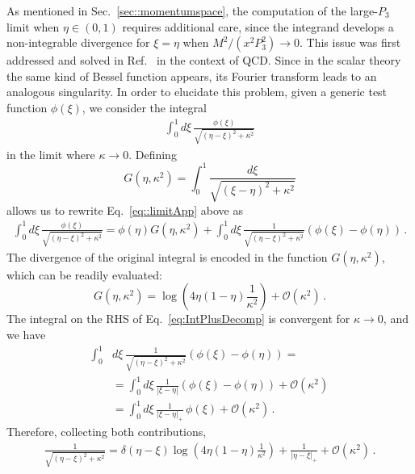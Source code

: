 As mentioned in Sec.~\ref{sec::momentumspace}, the computation of the
large-$P_3$ limit when $\eta \in \left(0,1\right)$ requires additional care,
since the integrand develops a non-integrable divergence for $\xi=\eta$ when
$M^2/(x^2P_3^2) \to 0$. This issue was first addressed and solved in Ref.~\cite{Radyushkin:2017lvu} in the context of QCD.
Since in the scalar theory the same kind of Bessel function appears, its Fourier transform leads to an analogous singularity. 
In order to elucidate this problem, given a generic test
function $\phi\left(\xi\right)$, we consider the integral
\begin{align}
    \label{eq::limitApp}
        \int_0^1 d\xi\,
        \frac{\phi\left(\xi\right)}{\sqrt{\left(\eta-\xi\right)^2 + \kappa^2}}
\end{align}
in the limit where $\kappa\to 0$. Defining 
\begin{equation}
    \label{eq:GfunDef}
    G\left(\eta, \kappa^2\right) = 
    \int_0^1 \frac{d\xi}{\sqrt{\left(\xi - \eta\right)^2 + \kappa^2}}
\end{equation}
allows us to rewrite Eq.~\eqref{eq::limitApp} above as 
\begin{align}
    \label{eq:IntPlusDecomp}
    \int_0^1 d\xi\,
    \frac{\phi\left(\xi\right)}{\sqrt{\left(\eta-\xi\right)^2 + \kappa^2}}
    = \phi(\eta) G\left(\eta, \kappa^2\right) + 
    \int_0^1 d\xi\,
    \frac{1}{\sqrt{\left(\eta-\xi\right)^2 + \kappa^2}}
    \left(\phi\left(\xi\right)-\phi\left(\eta\right)\right)\, .
\end{align}
The divergence of the original integral is encoded in the function
$G\left(\eta,\kappa^2\right)$, which can be readily evaluated:
\begin{equation}
    \label{eq:GfunIntegral}
    G\left(\eta, \kappa^2\right) =
    \log \left(4\eta\left(1-\eta\right)\frac{1}{\kappa^2}\right) +
    \mathcal O\left(\kappa^2\right)\, .
\end{equation}
The integral on the RHS of Eq.~\eqref{eq:IntPlusDecomp} is convergent for $\kappa\to
0$, and we have
\begin{align}
    \int_0^1 & d\xi\, 
    \frac{1}{\sqrt{\left(\eta-\xi\right)^2 + \kappa^2}} 
    \left(\phi\left(\xi\right)-\phi\left(\eta\right)\right) = 
    \nonumber \\
    &= \int_0^1 d\xi\, 
    \frac{1}{\left| \xi - \eta\right|}
    \left(\phi\left(\xi\right)-\phi\left(\eta\right)\right) 
    + \mathcal{O}(\kappa^2) \nonumber \\
    \label{eq:PlusDistrLimit}
    &= \int_0^1 d\xi\,
    \frac{1}{\left| \xi - \eta\right|_+}\,
    \phi\left(\xi\right) 
    + \mathcal{O}(\kappa^2) \, .
\end{align}
Therefore, collecting both contributions, 
\begin{align}
    \frac{1}{\sqrt{(\eta - \xi)^2 + \kappa^2}} = 
    \delta(\eta - \xi) \log\left(4\eta (1-\eta) \frac{1}{\kappa^2}\right)
    + \frac{1}{\left|\eta - \xi\right|_+} + \mathcal{O}\left(\kappa^2\right)\, .
\end{align}

